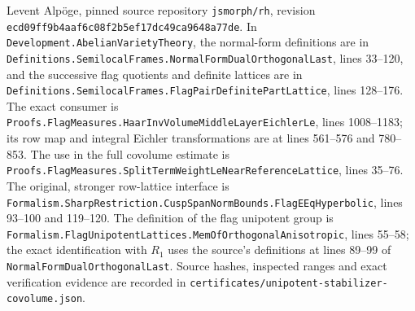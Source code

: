 Levent Alp\"oge, pinned source repository
\texttt{jsmorph/rh}, revision
\texttt{ecd09ff9b4aaf6c08f2b5ef17dc49ca9648a77de}.
In \texttt{Development.AbelianVarietyTheory}, the normal-form
definitions are in
\texttt{Definitions.\allowbreak SemilocalFrames.\allowbreak NormalFormDualOrthogonalLast},
lines 33--120, and the successive flag quotients and definite
lattices are in
\texttt{Definitions.\allowbreak SemilocalFrames.\allowbreak FlagPairDefinitePartLattice},
lines 128--176.
The exact consumer is
\texttt{Proofs.FlagMeasures.\allowbreak HaarInvVolumeMiddleLayerEichlerLe},
lines 1008--1183; its row map and integral Eichler transformations
are at lines 561--576 and 780--853.
The use in the full covolume estimate is
\texttt{Proofs.FlagMeasures.\allowbreak SplitTermWeightLeNearReferenceLattice},
lines 35--76.
The original, stronger row-lattice interface is
\texttt{Formalism.SharpRestriction.\allowbreak CuspSpanNormBounds.\allowbreak FlagEEqHyperbolic},
lines 93--100 and 119--120.
The definition of the flag unipotent group is
\texttt{Formalism.FlagUnipotentLattices.\allowbreak MemOfOrthogonalAnisotropic},
lines 55--58; the exact identification with $R_1$ uses
the source's definitions at lines 89--99 of
\texttt{NormalFormDualOrthogonalLast}.
Source hashes, inspected ranges and exact verification evidence are
recorded in
\texttt{certificates/unipotent-stabilizer-covolume.json}.
